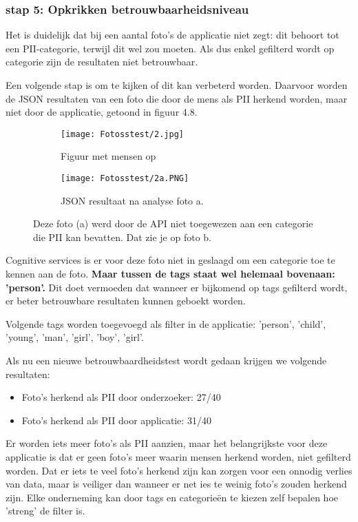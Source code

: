 \subsubsection{stap 5: Opkrikken betrouwbaarheidsniveau}
Het is duidelijk dat bij een aantal foto's de applicatie niet zegt: dit behoort tot een PII-categorie, terwijl dit wel zou moeten. Als dus enkel gefilterd wordt op categorie zijn de resultaten niet betrouwbaar.

Een volgende stap is om te kijken of dit kan verbeterd worden. Daarvoor worden de JSON resultaten van een foto die door de mens als PII herkend worden, maar niet door de applicatie, getoond in figuur 4.8. 

\begin{figure}[h]
	\centering
	\begin{subfigure}{0.45\textwidth}
		\centering
		\texttt{[image: Fotosstest/2.jpg]}
		\caption{Figuur met mensen op}
		\label{fig:qsdfqsdf}
	\end{subfigure}%
	\begin{subfigure}{0.45\textwidth}
		\centering
		\texttt{[image: Fotosstest/2a.PNG]}
		\caption{JSON resultaat na analyse foto a.}
		\label{fig:sub2}
	\end{subfigure}
	\caption{Deze foto (a) werd door de API niet toegewezen aan een categorie die PII kan bevatten. Dat zie je op foto b.}
	\label{fig:teqsdfqsdfst}
\end{figure}

Cognitive services is er voor deze foto niet in geslaagd om een categorie toe te kennen aan de foto. \textbf{Maar tussen de tags staat wel helemaal bovenaan: 'person'.} Dit doet vermoeden dat wanneer er bijkomend op tags gefilterd wordt, er beter betrouwbare resultaten kunnen geboekt worden. 

Volgende tags worden toegevoegd als filter in de applicatie: 'person', 'child', 'young', 'man', 'girl', 'boy', 'girl'.

Als nu een nieuwe betrouwbaardheidstest wordt gedaan krijgen we volgende resultaten: 
\begin{itemize}
	\item Foto's herkend als PII door onderzoeker: 27/40
	\item Foto's herkend als PII door applicatie: 31/40
\end{itemize}

Er worden iets meer foto's als PII aanzien, maar het belangrijkste voor deze applicatie is dat er geen foto's meer waarin mensen herkend worden, niet gefilterd worden. 
Dat er iets te veel foto's herkend zijn kan zorgen voor een onnodig verlies van data, maar is veiliger dan wanneer er net ies te weinig foto's zouden herkend zijn. Elke onderneming kan door tags en categorieën te kiezen zelf bepalen hoe 'streng' de filter is. 


